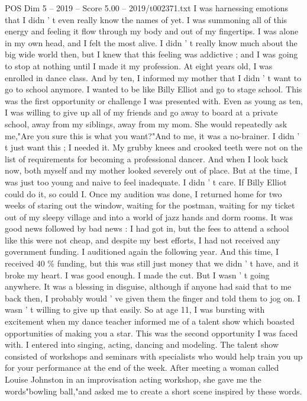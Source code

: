\begin{textsample}{POS Dim 5 – 2019 – Score 5.00 – 2019/t002371.txt}
I was harnessing emotions that I didn ' t even really know the names of yet.
I was summoning all of this energy and feeling it flow through my body and out of my fingertips.
I was alone in my own head, and I felt the most alive.
I didn ' t really know much about the big wide world then, but I knew that this feeling was addictive ; and I was going to stop at nothing until I made it my profession.
At eight years old, I was enrolled in dance class.
And by ten, I informed my mother that I didn ' t want to go to school anymore.
I wanted to be like Billy Elliot and go to stage school.
This was the first opportunity or challenge I was presented with.
Even as young as ten, I was willing to give up all of my friends and go away to board at a private school, away from my siblings, away from my mom.
She would repeatedly ask me,"Are you sure this is what you want?"And to me, it was a no-brainer.
I didn ' t just want this ; I needed it.
My grubby knees and crooked teeth were not on the list of requirements for becoming a professional dancer.
And when I look back now, both myself and my mother looked severely out of place.
But at the time, I was just too young and naive to feel inadequate.
I didn ' t care.
If Billy Elliot could do it, so could I.
Once my audition was done, I returned home for two weeks of staring out the window, waiting for the postman, waiting for my ticket out of my sleepy village and into a world of jazz hands and dorm rooms.
It was good news followed by bad news : I had got in, but the fees to attend a school like this were not cheap, and despite my best efforts, I had not received any government funding.
I auditioned again the following year.
And this time, I received 40 \% funding, but this was still just money that we didn ' t have, and it broke my heart.
I was good enough.
I made the cut.
But I wasn ' t going anywhere.
It was a blessing in disguise, although if anyone had said that to me back then, I probably would ' ve given them the finger and told them to jog on.
I wasn ' t willing to give up that easily.
So at age 11, I was bursting with excitement when my dance teacher informed me of a talent show which boasted opportunities of making you a star.
This was the second opportunity I was faced with.
I entered into singing, acting, dancing and modeling.
The talent show consisted of workshops and seminars with specialists who would help train you up for your performance at the end of the week.
After meeting a woman called Louise Johnston in an improvisation acting workshop, she gave me the words"bowling ball,"and asked me to create a short scene inspired by these words.

\end{textsample}
